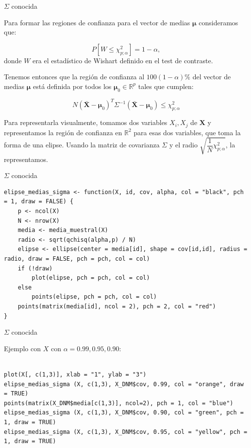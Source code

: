 \documentclass[xcolor=table]{beamer}
\begin{document}
\begin{frame}[fragile]{$\Sigma$ conocida}

Para formar las regiones de confianza para el vector de medias $\pmb{\mu}$ consideramos que:

$$P[W \leq  \chi^2_{p;\alpha}]= 1 - \alpha,$$
donde $W$ era el estadístico de Wishart definido en el test de contraste.

Tenemos entonces que la región de confianza al $100(1 - \alpha)\%$ del vector de medias $\pmb{\mu}$ está definida por todos los $\pmb{\mu}_0 \in \mathbb{R}^p$ tales que cumplen:

$$N (\pmb{\bar{X}} - \pmb{\mu}_0)^T \Sigma^{-1}(\pmb{\bar{X}} - \pmb{\mu}_0) \leq \chi^2_{p;\alpha}$$

Para representarla visualmente, tomamos dos variables $X_i,X_j$ de $\pmb{X}$ y representamos la región de confianza en $\mathbb{R}^2$ para esas dos variables, que toma la forma de una elipse. Usando la matriz de covarianza $\Sigma$ y el radio $\sqrt{\dfrac{1}{N} \chi^2_{p;\alpha}}$, la representamos.

\end{frame}

\begin{frame}[fragile]{$\Sigma$ conocida}

\begin{lstlisting}
elipse_medias_sigma <- function(X, id, cov, alpha, col = "black", pch = 1, draw = FALSE) {
    p <- ncol(X)
    N <- nrow(X)
    media <- media_muestral(X)
    radio <- sqrt(qchisq(alpha,p) / N)
    elipse <- ellipse(center = media[id], shape = cov[id,id], radius = radio, draw = FALSE, pch = pch, col = col)
    if (!draw)
        plot(elipse, pch = pch, col = col)
    else
        points(elipse, pch = pch, col = col)
    points(matrix(media[id], ncol = 2), pch = 2, col = "red")
}
\end{lstlisting}
\end{frame}


\begin{frame}[fragile]{$\Sigma$ conocida}

Ejemplo con $X$ con $\alpha = 0.99, 0.95, 0.90$:

\begin{lstlisting}

plot(X[, c(1,3)], xlab = "1", ylab = "3")
elipse_medias_sigma (X, c(1,3), X_DNM$cov, 0.99, col = "orange", draw = TRUE)
points(matrix(X_DNM$media[c(1,3)], ncol=2), pch = 1, col = "blue")
elipse_medias_sigma (X, c(1,3), X_DNM$cov, 0.90, col = "green", pch = 1, draw = TRUE)
elipse_medias_sigma (X, c(1,3), X_DNM$cov, 0.95, col = "yellow", pch = 1, draw = TRUE)

\end{lstlisting}

\end{frame}
\end{document}
